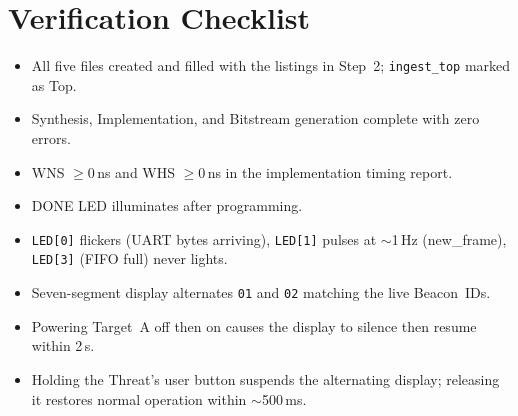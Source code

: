 \documentclass[11pt,letterpaper]{article}
\begin{document}

\newpage
\section{Verification Checklist}
\begin{itemize}[leftmargin=2em]
	\item[$\square$] All five \VHDL{} files created and filled with the listings in Step~2; \texttt{ingest\_top} marked as Top.
	\item[$\square$] Synthesis, Implementation, and Bitstream generation complete with zero errors.
	\item[$\square$] WNS $\geq 0$\,ns and WHS $\geq 0$\,ns in the implementation timing report.
	\item[$\square$] DONE LED illuminates after programming.
	\item[$\square$] \texttt{LED[0]} flickers (UART bytes arriving), \texttt{LED[1]} pulses at $\sim$1\,Hz (new\_frame), \texttt{LED[3]} (FIFO full) never lights.
	\item[$\square$] Seven-segment display alternates \texttt{01} and \texttt{02} matching the live Beacon~IDs.
	\item[$\square$] Powering Target~A off then on causes the display to silence then resume within 2\,s.
	\item[$\square$] Holding the Threat's user button suspends the alternating display; releasing it restores normal operation within $\sim$500\,ms.
\end{itemize}
\end{document}
